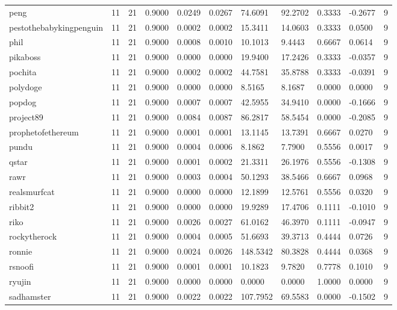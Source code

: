 \begin{table}[htbp]
\begin{tabular}{lllllllllll}
peng & 11 & 21 & 0.9000 & 0.0249 & 0.0267 & 74.6091 & 92.2702 & 0.3333 & -0.2677 & 9 \\
pestothebabykingpenguin & 11 & 21 & 0.9000 & 0.0002 & 0.0002 & 15.3411 & 14.0603 & 0.3333 & 0.0500 & 9 \\
phil & 11 & 21 & 0.9000 & 0.0008 & 0.0010 & 10.1013 & 9.4443 & 0.6667 & 0.0614 & 9 \\
pikaboss & 11 & 21 & 0.9000 & 0.0000 & 0.0000 & 19.9400 & 17.2426 & 0.3333 & -0.0357 & 9 \\
pochita & 11 & 21 & 0.9000 & 0.0002 & 0.0002 & 44.7581 & 35.8788 & 0.3333 & -0.0391 & 9 \\
polydoge & 11 & 21 & 0.9000 & 0.0000 & 0.0000 & 8.5165 & 8.1687 & 0.0000 & 0.0000 & 9 \\
popdog & 11 & 21 & 0.9000 & 0.0007 & 0.0007 & 42.5955 & 34.9410 & 0.0000 & -0.1666 & 9 \\
project89 & 11 & 21 & 0.9000 & 0.0084 & 0.0087 & 86.2817 & 58.5454 & 0.0000 & -0.2085 & 9 \\
prophetofethereum & 11 & 21 & 0.9000 & 0.0001 & 0.0001 & 13.1145 & 13.7391 & 0.6667 & 0.0270 & 9 \\
pundu & 11 & 21 & 0.9000 & 0.0004 & 0.0006 & 8.1862 & 7.7900 & 0.5556 & 0.0017 & 9 \\
qstar & 11 & 21 & 0.9000 & 0.0001 & 0.0002 & 21.3311 & 26.1976 & 0.5556 & -0.1308 & 9 \\
rawr & 11 & 21 & 0.9000 & 0.0003 & 0.0004 & 50.1293 & 38.5466 & 0.6667 & 0.0968 & 9 \\
realsmurfcat & 11 & 21 & 0.9000 & 0.0000 & 0.0000 & 12.1899 & 12.5761 & 0.5556 & 0.0320 & 9 \\
ribbit2 & 11 & 21 & 0.9000 & 0.0000 & 0.0000 & 19.9289 & 17.4706 & 0.1111 & -0.1010 & 9 \\
riko & 11 & 21 & 0.9000 & 0.0026 & 0.0027 & 61.0162 & 46.3970 & 0.1111 & -0.0947 & 9 \\
rockytherock & 11 & 21 & 0.9000 & 0.0004 & 0.0005 & 51.6693 & 39.3713 & 0.4444 & 0.0726 & 9 \\
ronnie & 11 & 21 & 0.9000 & 0.0024 & 0.0026 & 148.5342 & 80.3828 & 0.4444 & 0.0368 & 9 \\
rsnoofi & 11 & 21 & 0.9000 & 0.0001 & 0.0001 & 10.1823 & 9.7820 & 0.7778 & 0.1010 & 9 \\
ryujin & 11 & 21 & 0.9000 & 0.0000 & 0.0000 & 0.0000 & 0.0000 & 1.0000 & 0.0000 & 9 \\
sadhamster & 11 & 21 & 0.9000 & 0.0022 & 0.0022 & 107.7952 & 69.5583 & 0.0000 & -0.1502 & 9 \\

\end{tabular}
\end{table}
